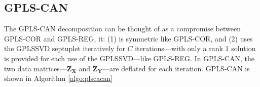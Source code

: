 \documentclass[12pt]{article}
\begin{document}
\hypertarget{gpls-can}{%
\subsection{GPLS-CAN}\label{gpls-can}}

The GPLS-CAN decomposition can be thought of as a compromise between
GPLS-COR and GPLS-REG, it: (1) is symmetric like GPLS-COR, and (2) uses
the GPLSSVD septuplet iteratively for \(C\) iterations---with only a
rank 1 solution is provided for each use of the GPLSSVD---like GPLS-REG.
In GPLS-CAN, the two data matrices---\({\mathbf Z}_{\mathbf X}\) and
\({\mathbf Z}_{\mathbf Y}\)---are deflated for each iteration. GPLS-CAN
is shown in Algorithm \ref{algo:plscacan}

\begin{algorithm}
\DontPrintSemicolon
\SetAlgoLined
{}
\BlankLine
{}
\end{algorithm}
\end{document}
